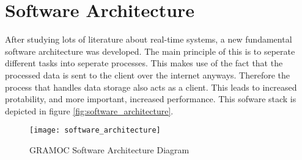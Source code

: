 \chapter{Software Architecture}
\label{ch:Software_Architecture}

\author{Nico Kratky}
%

After studying lots of literature about real-time systems, a new fundamental software architecture was developed. The main principle of this is to seperate different tasks into seperate processes. This makes use of the fact that the processed data is sent to the client over the internet anyways. Therefore the process that handles data storage also acts as a client. This leads to increased protability, and more important, increased performance. This sofware stack is depicted in figure \vref{fig:software_architecture}.

\begin{figure}[h]
    \centering
    \texttt{[image: software\_architecture]}
    \caption{GRAMOC Software Architecture Diagram}
    \label{fig:software_architecture}
\end{figure}






